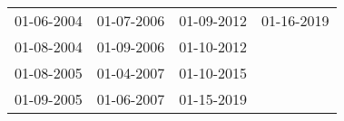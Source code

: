 \begin{supertabular}{llll}
 01-06-2004 &  01-07-2006 &  01-09-2012 &  01-16-2019 \\
 01-08-2004 &  01-09-2006 &  01-10-2012 &             \\
 01-08-2005 &  01-04-2007 &  01-10-2015 &             \\
 01-09-2005 &  01-06-2007 &  01-15-2019 &             \\
\end{supertabular}
